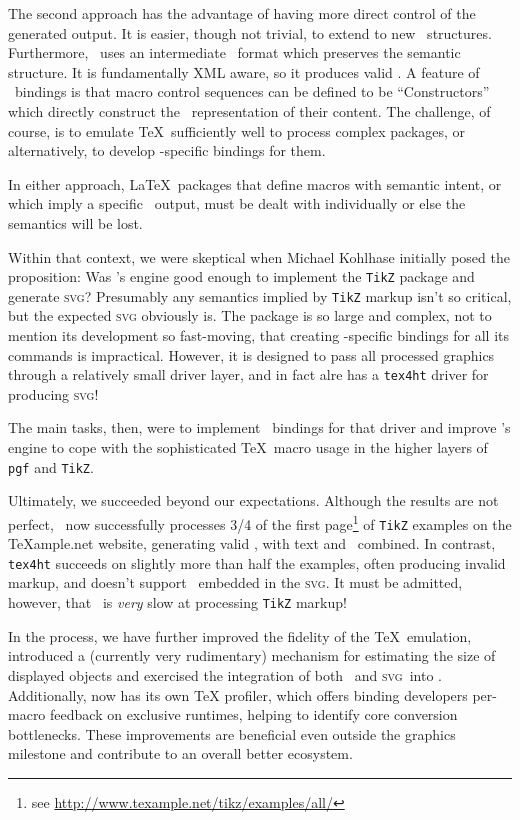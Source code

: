 \documentclass{llncs}
\def\svg{\textsc{svg}\xspace}
\def\tikz{\texttt{TikZ}\xspace}
\begin{document}
The second approach has the advantage of having more
direct control of the generated output.
It is easier, though not trivial, to extend to new
\XML\ structures.  Furthermore, \LaTeXML\
uses an intermediate \XML\ format which preserves
the semantic structure. It is fundamentally XML aware, so it produces valid \XML.
A feature of \LaTeXML\ bindings is that macro
control sequences can be defined to be ``Constructors''
which directly construct the \XML\ representation
of their content.
The challenge, of course, is to emulate \TeX\ sufficiently well to
process complex packages, or alternatively, to
develop \LaTeXML-specific bindings for them.

In either approach, \LaTeX\ packages that define
macros with semantic intent, or which imply a specific \XML\
output, must be dealt with
individually or else the semantics will be lost.

Within that context, we were skeptical when Michael Kohlhase
initially posed the proposition: Was \LaTeXML's engine good
enough to implement the \tikz package and generate \svg?
Presumably any semantics implied by \tikz markup isn't so critical,
but the expected \svg obviously is.
The package is so large and complex, not to mention
its development so fast-moving, that creating \LaTeXML-specific
bindings for all its commands is impractical.  However,
it is designed to pass all processed graphics through
a relatively small driver layer, and in fact alre has a \texttt{tex4ht} driver for producing \svg!

The main tasks, then, were to implement \LaTeXML\ bindings
for that driver and improve \LaTeXML's engine to cope
with the sophisticated \TeX\ macro usage in the higher
layers of \texttt{pgf} and \tikz.

Ultimately, we succeeded beyond our expectations.
Although the results are not perfect,
\LaTeXML\ now successfully processes 3/4 of the
first page\footnote{see \url{http://www.texample.net/tikz/examples/all/}} of \tikz examples on the
{\TeX}ample.net website, generating valid
\HTML5, with text and \MathML\ combined.
In contrast, \texttt{tex4ht} succeeds on slightly more
than half the examples, often producing invalid markup,
and doesn't support \MathML\ embedded in the \svg.
It must be admitted, however, that \LaTeXML\ is \emph{very}
slow at processing \tikz markup!

In the process, we have further improved the
fidelity of the \TeX\ emulation, introduced
a (currently very rudimentary) mechanism for estimating
the size of displayed objects and exercised the
integration of both \MathML\ and \svg\ into \HTML. 
Additionally, {\LaTeXML} now has its own {\TeX} profiler, which
offers binding developers per-macro feedback on
exclusive runtimes, helping to identify core conversion bottlenecks.
These improvements are beneficial even outside the graphics milestone and
contribute to an overall better {\LaTeXML} ecosystem.
\end{document}
